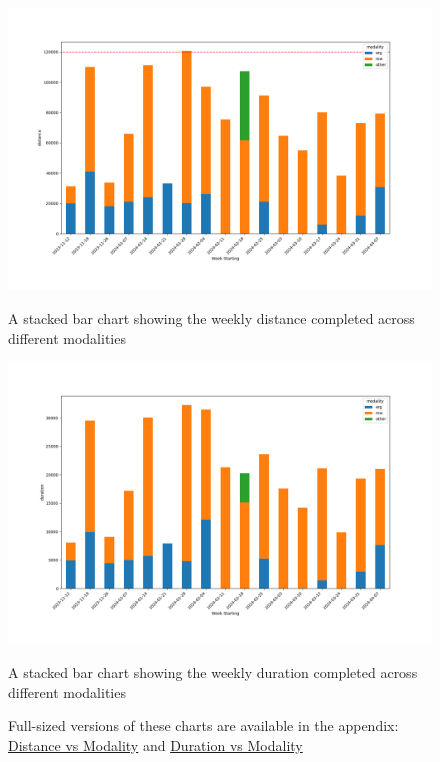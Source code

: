 \begin{figure}[htbp]
  \centering
  \begin{minipage}[c]{0.45\textwidth}
    \centering
    \includegraphics[width=\linewidth]{figures/distanceVsMod.png}
    \captionsetup{justification=centering}
    \caption[Distance vs Modality]{\label{fig:distanceVsMod}A stacked bar chart showing the weekly distance completed across different modalities}
  \end{minipage}
  \begin{minipage}[c]{0.45\textwidth}
    \centering
    \includegraphics[width=\linewidth]{figures/durationVsMod.png}
    \captionsetup{justification=centering}
    \caption[Duration vs Modality]{\label{fig:durationVsMod}A stacked bar chart showing the weekly duration completed across different modalities}
  \end{minipage}
  \captionsetup{justification=centering,width=0.7\linewidth}
  \caption*{Full-sized versions of these charts are available in the appendix: \hyperref[fig:app_distanceVsMod]{Distance vs Modality} and \hyperref[fig:app_durationVsMod]{Duration vs Modality}}
\end{figure}

